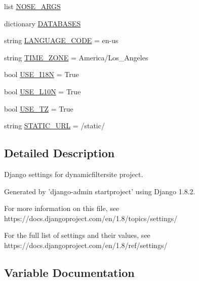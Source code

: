 \begin{DoxyCompactItemize}
\item 
list \mbox{\hyperlink{namespacedynamicfiltersite_1_1settings_a4b4f0b801c1d1b0fee67c8f45391ffb1}{N\+O\+S\+E\+\_\+\+A\+R\+GS}}
\item 
dictionary \mbox{\hyperlink{namespacedynamicfiltersite_1_1settings_a231cae2a3420dacff7b58a500c6b9555}{D\+A\+T\+A\+B\+A\+S\+ES}}
\item 
string \mbox{\hyperlink{namespacedynamicfiltersite_1_1settings_a85bdb273c38bd7f0a06a3a38aa81225c}{L\+A\+N\+G\+U\+A\+G\+E\+\_\+\+C\+O\+DE}} = \textquotesingle{}en-\/us\textquotesingle{}
\item 
string \mbox{\hyperlink{namespacedynamicfiltersite_1_1settings_a037ffded91b7904e73dda92d116594c6}{T\+I\+M\+E\+\_\+\+Z\+O\+NE}} = \textquotesingle{}America/Los\+\_\+\+Angeles\textquotesingle{}
\item 
bool \mbox{\hyperlink{namespacedynamicfiltersite_1_1settings_aa385f7186a262f3a197d89b86cd5b44f}{U\+S\+E\+\_\+\+I18N}} = True
\item 
bool \mbox{\hyperlink{namespacedynamicfiltersite_1_1settings_a2578e043379f868f8693d8299d915972}{U\+S\+E\+\_\+\+L10N}} = True
\item 
bool \mbox{\hyperlink{namespacedynamicfiltersite_1_1settings_a1ad6572b69b47cfda1778bf6e9cb6343}{U\+S\+E\+\_\+\+TZ}} = True
\item 
string \mbox{\hyperlink{namespacedynamicfiltersite_1_1settings_a428f2ec992bf4fd72c3c6344615535b0}{S\+T\+A\+T\+I\+C\+\_\+\+U\+RL}} = \textquotesingle{}/static/\textquotesingle{}
\end{DoxyCompactItemize}


\subsection{Detailed Description}
\begin{DoxyVerb}Django settings for dynamicfiltersite project.

Generated by 'django-admin startproject' using Django 1.8.2.

For more information on this file, see
https://docs.djangoproject.com/en/1.8/topics/settings/

For the full list of settings and their values, see
https://docs.djangoproject.com/en/1.8/ref/settings/
\end{DoxyVerb}
 

\subsection{Variable Documentation}
\mbox{\label{namespacedynamicfiltersite_1_1settings_a1c65930ce3d00aea720781bc9c17b0b8}} 
